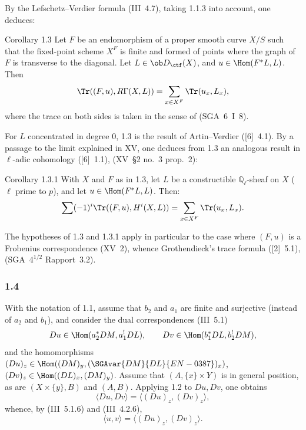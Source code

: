 By the Lefschetz--Verdier formula (III~4.7), taking 1.1.3 into account, one deduces:

\begin{statement}{Corollary 1.3}
Let $F$ be an endomorphism of a proper smooth curve $X/S$ such that the fixed-point scheme $X^F$ is finite and formed of points where the graph of $F$ is transverse to the diagonal. Let $L\in\ob D_{\ctf}(X)$, and $u\in\Hom(F^*L,L)$. Then
\[
\Tr((F,u),R\Gamma(X,L))=\sum_{x\in X^F}\Tr(u_x,L_x),
\]
where the trace on both sides is taken in the sense of (SGA~6~I~8).
\end{statement}

For $L$ concentrated in degree $0$, 1.3 is the result of Artin--Verdier ([6]~4.1). By a passage to the limit explained in XV, one deduces from 1.3 an analogous result in $\ell$-adic cohomology ([6]~1.1), (XV~\S2 no.~3 prop.~2):

\begin{statement}{Corollary 1.3.1}
With $X$ and $F$ as in 1.3, let $L$ be a constructible $\mathbb Q_\ell$-sheaf on $X$ ($\ell$ prime to $p$), and let $u\in\Hom(F^*L,L)$. Then:
\[
\sum(-1)^i\Tr((F,u),H^i(X,L))=\sum_{x\in X^F}\Tr(u_x,L_x).
\]
\end{statement}

The hypotheses of 1.3 and 1.3.1 apply in particular to the case where $(F,u)$ is a Frobenius correspondence (XV~2), whence Grothendieck's trace formula ([2]~5.1), (SGA~$4^{1/2}$ Rapport~3.2).

\subsubsection*{1.4}
With the notation of 1.1, assume that $b_2$ and $a_1$ are finite and surjective (instead of $a_2$ and $b_1$), and consider the dual correspondences (III~5.1)
\[
Du\in\Hom(a_2^*DM,a_1^!DL),\qquad Dv\in\Hom(b_1^*DL,b_2^!DM),
\]
and the homomorphisms $(Du)_z\in\Hom((DM)_y,(\SGAvar{DM}{DL}{EN-0387})_x)$, $(Dv)_z\in\Hom((DL)_x,(DM)_y)$. Assume that $(A,\{x\}\times Y)$ is in general position, as are $(X\times\{y\},B)$ and $(A,B)$. Applying 1.2 to $Du,Dv$, one obtains
\[
\langle Du,Dv\rangle=\langle (Du)_z,(Dv)_z\rangle,
\]
whence, by (III~5.1.6) and (III~4.2.6),
\begin{equation}\tag{1.4.1}
\langle u,v\rangle=\langle (Du)_z,(Dv)_z\rangle.
\end{equation}

